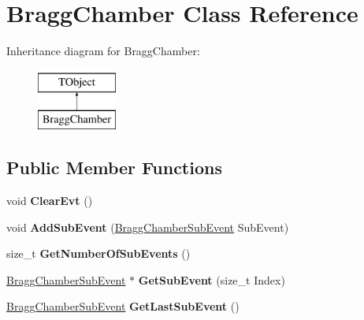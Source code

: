 \hypertarget{class_bragg_chamber}{\section{Bragg\-Chamber Class Reference}
\label{class_bragg_chamber}
}
Inheritance diagram for Bragg\-Chamber\-:\begin{figure}[H]
\begin{center}
\leavevmode
\includegraphics[height=2.000000cm]{class_bragg_chamber}
\end{center}
\end{figure}
\subsection*{Public Member Functions}
\begin{DoxyCompactItemize}
\item 
\hypertarget{class_bragg_chamber_ae8a4df69182d582b29182850f3aeacbe}{void {\bfseries Clear\-Evt} ()}\label{class_bragg_chamber_ae8a4df69182d582b29182850f3aeacbe}

\item 
\hypertarget{class_bragg_chamber_a578cee86f2c835bcf877e89f2cc3dcc7}{void {\bfseries Add\-Sub\-Event} (\hyperlink{class_bragg_chamber_sub_event}{Bragg\-Chamber\-Sub\-Event} Sub\-Event)}\label{class_bragg_chamber_a578cee86f2c835bcf877e89f2cc3dcc7}

\item 
\hypertarget{class_bragg_chamber_a5dae757b5621222d724e2aa1a36f5ac3}{size\-\_\-t {\bfseries Get\-Number\-Of\-Sub\-Events} ()}\label{class_bragg_chamber_a5dae757b5621222d724e2aa1a36f5ac3}

\item 
\hypertarget{class_bragg_chamber_a03454d6f7eb1605bd0dcc5cbce199b7e}{\hyperlink{class_bragg_chamber_sub_event}{Bragg\-Chamber\-Sub\-Event} $\ast$ {\bfseries Get\-Sub\-Event} (size\-\_\-t Index)}\label{class_bragg_chamber_a03454d6f7eb1605bd0dcc5cbce199b7e}

\item 
\hypertarget{class_bragg_chamber_a2bb4b74450e9d16b1634e43b86f64bf8}{\hyperlink{class_bragg_chamber_sub_event}{Bragg\-Chamber\-Sub\-Event} {\bfseries Get\-Last\-Sub\-Event} ()}\label{class_bragg_chamber_a2bb4b74450e9d16b1634e43b86f64bf8}

\end{DoxyCompactItemize}
